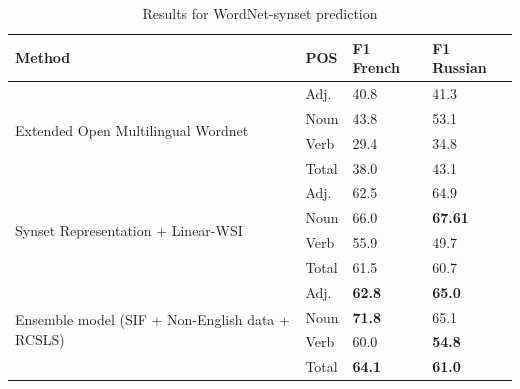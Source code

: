 \documentclass[11pt,a4paper]{article}
\begin{document}
\begin{table}[h]
	\small
	\caption{Results for WordNet-synset prediction}
	\label{wordnet-results}		
	\centering
	\begin{tabular}{l l l l}
		Method & POS & F1 French & F1 Russian
		\\
		\hline
		\multirow{4}{*}{Extended Open Multilingual Wordnet \cite{bond-wordnet}}
		& \multicolumn{1}{l}{Adj.} & \multicolumn{1}{l}{40.8} & \multicolumn{1}{l}{41.3} \\
		& \multicolumn{1}{l}{Noun} & \multicolumn{1}{l}{43.8} & \multicolumn{1}{l}{53.1} \\
		& \multicolumn{1}{l}{Verb} & \multicolumn{1}{l}{29.4} & \multicolumn{1}{l}{34.8} \\
		& \multicolumn{1}{l}{Total} & \multicolumn{1}{l}{38.0} & \multicolumn{1}{l}{43.1} \\
		\hline
		\multirow{4}{*}{Synset Representation + Linear-WSI \cite{Khodak2017}}
		& \multicolumn{1}{l}{Adj.} & \multicolumn{1}{l}{62.5} & \multicolumn{1}{l}{64.9} \\
		& \multicolumn{1}{l}{Noun} & \multicolumn{1}{l}{66.0} & \multicolumn{1}{l}{\textbf{67.61}} \\
		& \multicolumn{1}{l}{Verb} & \multicolumn{1}{l}{55.9} & \multicolumn{1}{l}{49.7} \\
		& \multicolumn{1}{l}{Total} & \multicolumn{1}{l}{61.5} & \multicolumn{1}{l}{60.7} \\
		
		\hline
		\multirow{4}{*}{Ensemble model (SIF + Non-English data + RCSLS)}
		& \multicolumn{1}{l}{Adj.} & \multicolumn{1}{l}{\textbf{62.8}} & \multicolumn{1}{l}{\textbf{65.0}} \\
		& \multicolumn{1}{l}{Noun} & \multicolumn{1}{l}{\textbf{71.8}} & \multicolumn{1}{l}{65.1} \\
		& \multicolumn{1}{l}{Verb} & \multicolumn{1}{l}{60.0} & \multicolumn{1}{l}{\textbf{54.8}} \\
		& \multicolumn{1}{l}{Total} & \multicolumn{1}{l}{\textbf{64.1}} & \multicolumn{1}{l}{\textbf{61.0}} \\
		

\end{tabular}
\end{table}
\end{document}
